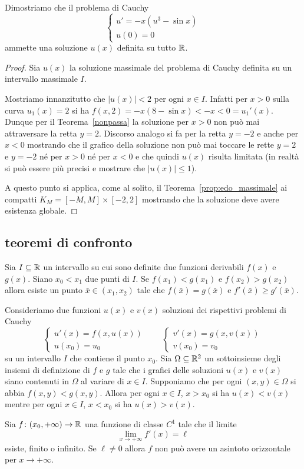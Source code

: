 \begin{example}
Dimostriamo che il problema di Cauchy
\[
\begin{cases}
	u' = -x(u^3 - \sin x) \\
	u(0) = 0
\end{cases}
\]
ammette una soluzione $u(x)$ definita su tutto ${\mathbb R}$.
\end{example}
%
\begin{proof}
Sia $u(x)$ la soluzione massimale del problema di Cauchy
definita su un intervallo massimale $I$.

Mostriamo innanzitutto che $\vert u(x) \vert < 2$ per ogni $x\in
I$.
Infatti per $x>0$ sulla curva $u_1(x)=2$ si ha $f(x,2) = -x
(8-\sin x) < -x < 0 = u_1'(x)$.
Dunque per il Teorema~\ref{nonpassa} la
soluzione per $x>0$ non può mai attraversare la retta
$y=2$.
Discorso analogo si fa per la retta $y=-2$ e anche per $x<0$
mostrando che il grafico della  soluzione non può mai toccare le
rette $y=2$ e $y=-2$ né per $x>0$ né per $x<0$
e che quindi $u(x)$ risulta limitata (in realtà si
può essere più precisi e mostrare che $\vert u(x)\vert \le 1$).

A questo punto si applica, come al solito, il Teorema~\ref{prop:edo_massimale} ai
compatti $K_M=[-M,M]\times[-2,2]$ mostrando che la soluzione deve
avere esistenza globale.
\end{proof}

\subsection{teoremi di confronto}

\begin{theorem}
Sia $I\subseteq {\mathbb R}$ un intervallo su cui sono definite due funzioni derivabili
$f(x)$ e $g(x)$.
Siano $x_0<x_1$ due punti di $I$. Se $f(x_1)<g(x_1)$ e $f(x_2)>g(x_2)$
allora esiste un punto $\bar x \in (x_1,x_2)$ tale che $f(\bar
x)=g(\bar x)$ e $f'(\bar x)\ge g'(\bar x)$.
\end{theorem}

\begin{theorem}
Consideriamo due funzioni $u(x)$ e $v(x)$ soluzioni dei rispettivi
problemi di Cauchy
\[
\begin{cases}
  u'(x)  = f(x,u(x))\\
  u(x_0) = u_0
\end{cases}
\qquad
\begin{cases}
  v'(x) = g(x,v(x))\\
  v(x_0) = v_0
\end{cases}
\]
su un intervallo $I$ che contiene il punto $x_0$.
Sia $\Omega\subseteq {\mathbb R}^2$ un sottoinsieme degli insiemi di definizione
di $f$ e $g$ tale che i grafici delle soluzioni $u(x)$ e $v(x)$ siano
contenuti in $\Omega$ al variare di $x\in I$.
Supponiamo che per ogni $(x,y)\in\Omega$ si abbia $f(x,y)<g(x,y)$.
Allora per ogni $x\in I$, $x> x_0$ si ha $u(x)< v(x)$ mentre per ogni
$x\in I$, $x<x_0$ si ha $u(x)>v(x)$.
\end{theorem}

\begin{theorem}
Sia $f\colon (x_0,+\infty)\to {\mathbb R}$ una funzione di classe
$C^1$ tale
che il limite
\[
  \lim_{x\to +\infty} f'(x) = \ell
\]
esiste, finito o infinito. Se $\ell\neq 0$ allora $f$ non può avere
un asintoto orizzontale per $x\to +\infty$.
\end{theorem}
